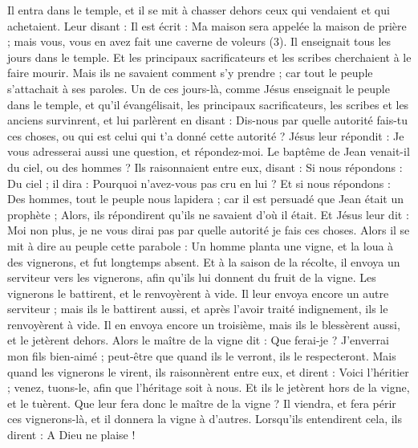 \begin{multicols}{2}
Il entra dans le temple, et il se mit à chasser dehors ceux qui vendaient et qui achetaient.
Leur disant : Il est écrit : Ma maison sera appelée la maison de prière ; mais vous, vous en avez fait une caverne de voleurs (3).
Il enseignait tous les jours dans le temple. Et les principaux sacrificateurs et les scribes cherchaient à le faire mourir.
Mais ils ne savaient comment s’y prendre ; car tout le peuple s’attachait à ses paroles.
\VerseOne{}Un de ces jours-là, comme Jésus enseignait le peuple dans le temple, et qu'il évangélisait, les principaux sacrificateurs, les scribes et les anciens survinrent,
et lui parlèrent en disant : Dis-nous par quelle autorité fais-tu ces choses, ou qui est celui qui t'a donné cette autorité ?
Jésus leur répondit : Je vous adresserai aussi une question, et répondez-moi.
Le baptême de Jean venait-il du ciel, ou des hommes ?
Ils raisonnaient entre eux, disant : Si nous répondons : Du ciel ; il dira : Pourquoi n’avez-vous pas cru en lui ?
Et si nous répondons : Des hommes, tout le peuple nous lapidera ; car il est persuadé que Jean était un prophète ;
Alors, ils répondirent qu'ils ne savaient d'où il était.
Et Jésus leur dit : Moi non plus, je ne vous dirai pas par quelle autorité je fais ces choses.
Alors il se mit à dire au peuple cette parabole : Un homme planta une vigne, et la loua à des vignerons, et fut longtemps absent.
Et à la saison de la récolte, il envoya un serviteur vers les vignerons, afin qu'ils lui donnent du fruit de la vigne. Les vignerons le battirent, et le renvoyèrent à vide.
Il leur envoya encore un autre serviteur ; mais ils le battirent aussi, et après l'avoir traité indignement, ils le renvoyèrent à vide.
Il en envoya encore un troisième, mais ils le blessèrent aussi, et le jetèrent dehors.
Alors le maître de la vigne dit : Que ferai-je ? J’enverrai mon fils bien-aimé ; peut-être que quand ils le verront, ils le respecteront.
Mais quand les vignerons le virent, ils raisonnèrent entre eux, et dirent : Voici l'héritier ; venez, tuons-le, afin que l'héritage soit à nous.
Et ils le jetèrent hors de la vigne, et le tuèrent. Que leur fera donc le maître de la vigne ?
Il viendra, et fera périr ces vignerons-là, et il donnera la vigne à d'autres. Lorsqu’ils entendirent cela, ils dirent : A Dieu ne plaise !

\end{multicols}
